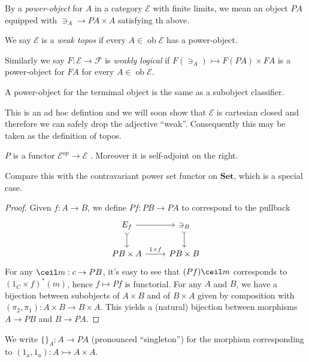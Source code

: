 \documentclass[a4paper]{article}
\renewcommand{\c}[1]{\mathbf{#1}}
\DeclareMathOperator{\ob}{ob}
\newcommand{\Set}{{\c{Set}}}
\newcommand{\mono}{\rightarrowtail}
\begin{document}
\begin{definition}
  By a \emph{power-object} for \(A\) in a category \(\mathcal E\) with finite limits, we mean an object \(PA\) equipped with \(\ni_A \to PA \times A\) satisfying th above.

  We say \(\mathcal E\) is a \emph{weak topos} if every \(A \in \ob \mathcal E\) has a power-object.

  Similarly we say \(F: \mathcal E \to \mathcal F\) is \emph{weakly logical} if \(F(\ni_A) \mono F(PA) \times FA\) is a power-object for \(FA\) for every \(A \in \ob \mathcal E\).
\end{definition}

A power-object for the termimal object is the same as a subobject classifier.

This is an ad hoc defintion and we will soon show that \(\mathcal E\) is cartesian closed and therefore we can safely drop the adjective ``weak''. Consequently this may be taken as the definition of topos.

\begin{lemma}
  \(P\) is a functor \(\mathcal E^{\text{op}} \to \mathcal E\) . Moreover it is self-adjoint on the right.
\end{lemma}

Compare this with the contravariant power set functor on \(\Set\), which is a special case.

\begin{proof}
  Given \(f: A \to B\), we define \(Pf: PB \to PA\) to correspond to the pullback
  \[
    \begin{tikzcd}
      E_f \ar[r] \ar[d, tail] & \ni_B \ar[d, tail] \\
      PB \times A \ar[r, "1 \times f"] & PB \times B
    \end{tikzcd}
  \]
  For any \(\ceil m: c \to PB\), it's easy to see that \((Pf) \ceil m\) corresponds to \((1_C \times f)^* (m)\), hence \(f \mapsto Pf\) is functorial. For any \(A\) and \(B\), we have a bijection between subobjects of \(A \times B\) and of \(B \times A\) given by composition with \((\pi_2, \pi_1): A \times B \to B \times A\). This yields a (natural) bijection between morphisms \(A \to PB\) and \(B \to PA\).
\end{proof}

We write \(\{\}_A: A \to PA\) (pronounced ``singleton'') for the morphism corresponding to \((1_a, 1_a): A \mono A \times A\).
\end{document}
